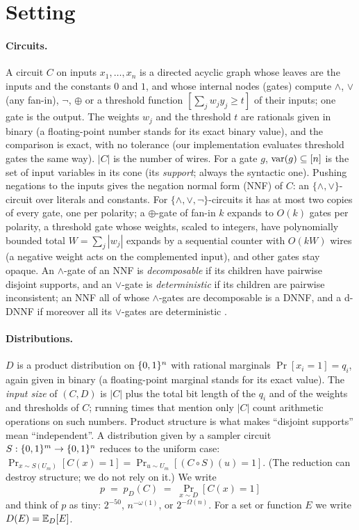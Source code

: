\section{Setting}\label{sec:setting}

\paragraph{Circuits.}
A circuit $C$ on inputs $x_1,\dots,x_n$ is a directed acyclic graph whose
leaves are the inputs and the constants $0$ and $1$, and whose internal nodes
(gates) compute $\wedge$, $\vee$ (any fan-in), $\neg$, $\oplus$ or a threshold
function $[\sum_j w_j y_j \ge t]$ of their inputs; one gate is the output. The
weights $w_j$ and the threshold $t$ are rationals given in binary (a
floating-point number stands for its exact binary value), and the comparison is
exact, with no tolerance (our implementation evaluates threshold gates the same
way). $|C|$ is the number of wires. For a gate $g$,
$\mathrm{var}(g)\subseteq[n]$ is the set of input variables in its cone (its
\emph{support}; always the syntactic one). Pushing negations to the inputs gives
the negation normal form (NNF) of $C$: an $\{\wedge,\vee\}$-circuit over literals
and constants. For $\{\wedge,\vee,\neg\}$-circuits it has at most two copies of
every gate, one per polarity; a $\oplus$-gate of fan-in $k$ expands to $O(k)$ gates
per polarity, a threshold gate whose weights, scaled to integers, have polynomially
bounded total $W=\sum_j|w_j|$ expands by a sequential counter with $O(kW)$ wires (a
negative weight acts on the complemented input), and other gates stay opaque. An
$\wedge$-gate of an NNF is \emph{decomposable} if its children have pairwise
disjoint supports, and an $\vee$-gate is \emph{deterministic} if its children are
pairwise inconsistent; an NNF all of whose $\wedge$-gates are decomposable is a
DNNF, and a d-DNNF if moreover all its $\vee$-gates are deterministic
\cite{darwiche2002map}.

\paragraph{Distributions.}
$D$ is a product distribution on $\{0,1\}^n$ with rational marginals
$\Pr[x_i=1]=q_i$, again given in binary (a floating-point marginal stands for its
exact value). The \emph{input size} of $(C,D)$ is $|C|$ plus the total bit length
of the $q_i$ and of the weights and thresholds of $C$; running times that mention
only $|C|$ count arithmetic operations on such numbers. Product
structure is what makes ``disjoint supports'' mean ``independent''. A
distribution given by a sampler circuit $S:\{0,1\}^m\to\{0,1\}^n$ reduces to the
uniform case: $\Pr_{x\sim S(U_m)}[C(x)=1]=\Pr_{u\sim U_m}[(C\circ S)(u)=1]$.
(The reduction can destroy structure; we do not rely on it.) We write
\[
  p \;=\; p_D(C) \;=\; \Pr_{x\sim D}[C(x)=1]
\]
and think of $p$ as tiny: $2^{-50}$, $n^{-\omega(1)}$, or $2^{-\Omega(n)}$.
For a set or function $E$ we write $D(E)=\mathbb{E}_D[E]$.

